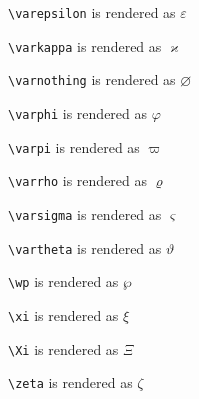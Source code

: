 \texttt{\textbackslash varepsilon} is rendered as $\varepsilon$


\texttt{\textbackslash varkappa} is rendered as $\varkappa$


\texttt{\textbackslash varnothing} is rendered as $\varnothing$


\texttt{\textbackslash varphi} is rendered as $\varphi$


\texttt{\textbackslash varpi} is rendered as $\varpi$


\texttt{\textbackslash varrho} is rendered as $\varrho$


\texttt{\textbackslash varsigma} is rendered as $\varsigma$


\texttt{\textbackslash vartheta} is rendered as $\vartheta$


\texttt{\textbackslash wp} is rendered as $\wp$


\texttt{\textbackslash xi} is rendered as $\xi$


\texttt{\textbackslash Xi} is rendered as $\Xi$


\texttt{\textbackslash zeta} is rendered as $\zeta$

